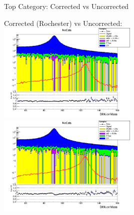 \documentclass[pdf, 9pt]{beamer}
\newcommand\PlaceText[3]{%
\begin{tikzpicture}[remember picture,overlay]
\node[outer sep=0pt,inner sep=0pt,anchor=south west]
  at ([xshift=#1,yshift=-#2]current page.north west) {#3};
\end{tikzpicture}%
}
\begin{document}
  \begin{frame}{Top Category: Corrected vs Uncorrected}
    \begin{center}
      Corrected (Rochester) vs Uncorrected:\\
      \vspace{0.5cm}
      \includegraphics[width=0.5\textwidth, height=0.5\textheight]{figs/higgs/distributions/baseline_rochester/distribution__NoCats__DiMuonMass__logY.png}
      \includegraphics[width=0.5\textwidth, height=0.5\textheight]{figs/higgs/distributions/baseline_nocorrections/distribution__NoCats__DiMuonMass__logY.png}
    \end{center}
  \end{frame}
\end{document}
